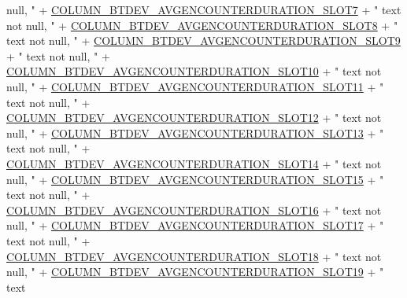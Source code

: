 \begin{DoxyCode}
{       null, "}
              + \hyperlink{classcom_1_1social_1_1proximity_1_1_s_q_lite_helper_a7ead17ba779351a033117f59e833b2fe}{COLUMN\_BTDEV\_AVGENCOUNTERDURATION\_SLOT7} + \textcolor{stringliteral}{" text not
       null, "}
              + \hyperlink{classcom_1_1social_1_1proximity_1_1_s_q_lite_helper_a15bba1730515628bc4aff17ec1d8c9c4}{COLUMN\_BTDEV\_AVGENCOUNTERDURATION\_SLOT8} + \textcolor{stringliteral}{" text not
       null, "}
              + \hyperlink{classcom_1_1social_1_1proximity_1_1_s_q_lite_helper_a671f0ef4fc52b1a396356de9b080dd05}{COLUMN\_BTDEV\_AVGENCOUNTERDURATION\_SLOT9} + \textcolor{stringliteral}{" text not
       null, "}
              + \hyperlink{classcom_1_1social_1_1proximity_1_1_s_q_lite_helper_a36ef1962f26aead1302bdd08da18fc76}{COLUMN\_BTDEV\_AVGENCOUNTERDURATION\_SLOT10} + \textcolor{stringliteral}{" text
       not null, "}
              + \hyperlink{classcom_1_1social_1_1proximity_1_1_s_q_lite_helper_a5f9d6d711fdab1b4887213020b14908d}{COLUMN\_BTDEV\_AVGENCOUNTERDURATION\_SLOT11} + \textcolor{stringliteral}{" text
       not null, "}
              + \hyperlink{classcom_1_1social_1_1proximity_1_1_s_q_lite_helper_a33f2bcc11870df8e8f78ca94d44c870a}{COLUMN\_BTDEV\_AVGENCOUNTERDURATION\_SLOT12} + \textcolor{stringliteral}{" text
       not null, "}
              + \hyperlink{classcom_1_1social_1_1proximity_1_1_s_q_lite_helper_a60029078266511cdbba0b2b022ac3319}{COLUMN\_BTDEV\_AVGENCOUNTERDURATION\_SLOT13} + \textcolor{stringliteral}{" text
       not null, "}
              + \hyperlink{classcom_1_1social_1_1proximity_1_1_s_q_lite_helper_aff03ab377c605903c8ebab1716ef9616}{COLUMN\_BTDEV\_AVGENCOUNTERDURATION\_SLOT14} + \textcolor{stringliteral}{" text
       not null, "}
              + \hyperlink{classcom_1_1social_1_1proximity_1_1_s_q_lite_helper_a030cda34629f2ebe573a5528561b6a2a}{COLUMN\_BTDEV\_AVGENCOUNTERDURATION\_SLOT15} + \textcolor{stringliteral}{" text
       not null, "}
              + \hyperlink{classcom_1_1social_1_1proximity_1_1_s_q_lite_helper_af25494a3047b9adb89340e54d94a5dc3}{COLUMN\_BTDEV\_AVGENCOUNTERDURATION\_SLOT16} + \textcolor{stringliteral}{" text
       not null, "}
              + \hyperlink{classcom_1_1social_1_1proximity_1_1_s_q_lite_helper_a9a7d1eb2eb2639091df2ea97e0dfeb7d}{COLUMN\_BTDEV\_AVGENCOUNTERDURATION\_SLOT17} + \textcolor{stringliteral}{" text
       not null, "}
              + \hyperlink{classcom_1_1social_1_1proximity_1_1_s_q_lite_helper_a0eaf0df061e77b43c9856c68f685d483}{COLUMN\_BTDEV\_AVGENCOUNTERDURATION\_SLOT18} + \textcolor{stringliteral}{" text
       not null, "}
              + \hyperlink{classcom_1_1social_1_1proximity_1_1_s_q_lite_helper_ab4ea60ed82b06142cb4474db3604c1a7}{COLUMN\_BTDEV\_AVGENCOUNTERDURATION\_SLOT19} + \textcolor{stringliteral}{" text
}
\end{DoxyCode}
